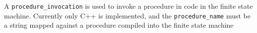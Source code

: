 A {\tt procedure\_invocation} is used to invoke a procedure in code in the finite state machine.
Currently only C++ is implemented, and the {\tt procedure\_name} must
be a string mapped against a procedure compiled into the finite state machine